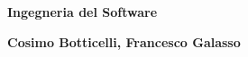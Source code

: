 \documentclass[12pt]{book}
\begin{document}
\begin{titlepage}
    \begin{center}
        \vspace*{1cm}
            
        \Huge
        \textbf{Ingegneria del Software}
        
        \large
        \textbf{Cosimo Botticelli, Francesco Galasso}
            
        \vfill
    \end{center}
\end{titlepage}












\end{document}
